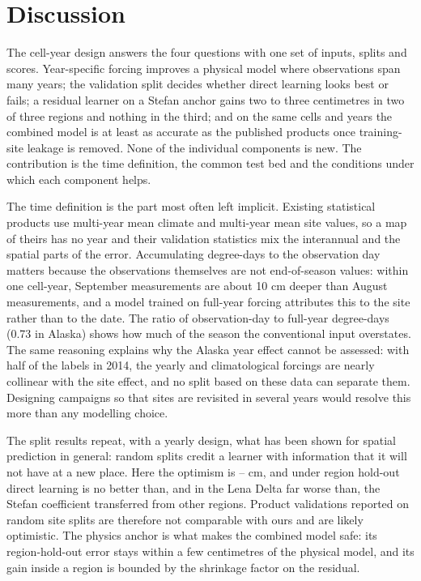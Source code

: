\section{Discussion}\label{sec:discussion}

The cell-year design answers the four questions with one set of inputs, splits and scores. Year-specific forcing improves a physical model where observations span many years; the validation split decides whether direct learning looks best or fails; a residual learner on a Stefan anchor gains two to three centimetres in two of three regions and nothing in the third; and on the same cells and years the combined model is at least as accurate as the published products once training-site leakage is removed. None of the individual components is new. The contribution is the time definition, the common test bed and the conditions under which each component helps.

The time definition is the part most often left implicit. Existing statistical products use multi-year mean climate and multi-year mean site values, so a map of theirs has no year and their validation statistics mix the interannual and the spatial parts of the error. Accumulating degree-days to the observation day matters because the observations themselves are not end-of-season values: within one cell-year, September measurements are about 10 cm deeper than August measurements, and a model trained on full-year forcing attributes this to the site rather than to the date. The ratio of observation-day to full-year degree-days (0.73 in Alaska) shows how much of the season the conventional input overstates. The same reasoning explains why the Alaska year effect cannot be assessed: with half of the labels in 2014, the yearly and climatological forcings are nearly collinear with the site effect, and no split based on these data can separate them. Designing campaigns so that sites are revisited in several years would resolve this more than any modelling choice.

The split results repeat, with a yearly design, what has been shown for spatial prediction in general\cite{Roberts2017,Ploton2020,MeyerPebesma2022}: random splits credit a learner with information that it will not have at a new place. Here the optimism is \noptimLeDz{}--\noptimCaDz{} cm, and under region hold-out direct learning is no better than, and in the Lena Delta far worse than, the Stefan coefficient transferred from other regions. Product validations reported on random site splits are therefore not comparable with ours and are likely optimistic. The physics anchor is what makes the combined model safe: its region-hold-out error stays within a few centimetres of the physical model, and its gain inside a region is bounded by the shrinkage factor on the residual.

